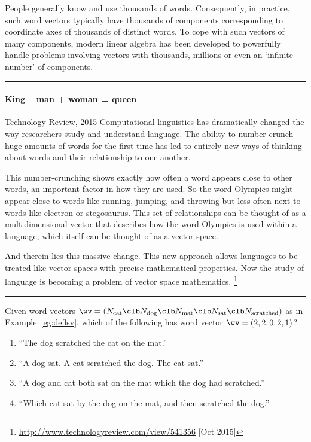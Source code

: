 \begin{example}
People generally know and use thousands of words.
Consequently, in practice, such word vectors typically have thousands of components corresponding to coordinate axes of thousands of distinct words.
To cope with such vectors of many components, modern linear algebra has been developed to powerfully handle problems involving vectors with thousands, millions or even an `infinite number' of components.
\end{example}

\begin{table}
\hrule
\begin{minipage}{\linewidth}
\paragraph{King -- man + woman = queen}
\begin{quoted}{Technology Review, 2015}
Computational linguistics has dramatically changed the way researchers study and understand language. 
The ability to number-crunch huge amounts of words for the first time has led to entirely new ways of thinking about words and their relationship to one another.

This number-crunching shows exactly how often a word appears close to other words, an important factor in how they are used. 
So the word Olympics might appear close to words like running, jumping, and throwing but less often next to words like electron or stegosaurus.  
This set of relationships can be thought of as a multidimensional vector that describes how the word Olympics is used within a language, which itself can be thought of as a vector space.  

And therein lies this massive change. 
This new approach allows languages to be treated like vector spaces with precise mathematical properties. 
Now the study of language is becoming a problem of vector space mathematics.
\footnote{\url{http://www.technologyreview.com/view/541356} [Oct 2015]}
\end{quoted}
\end{minipage}
\hrule
\end{table}




\begin{activity}
Given word vectors \(\wv=(N_{\text{cat}}\clb N_{\text{dog}}\clb N_{\text{mat}}\clb N_{\text{sat}}\clb N_{\text{scratched}})\) as in Example~\ref{eg:deflsv},
which of the following has word vector \(\wv=(2,2,0,2,1)\)?
\begin{enumerate}
\item ``The dog scratched the cat on the mat.''
\item ``A dog sat.  A cat scratched the dog.  The cat sat.''
\item ``A dog and cat both sat on the mat which the dog had scratched.''
\item ``Which cat sat by the dog on the mat, and then scratched the dog.''
\end{enumerate}
\end{activity}







